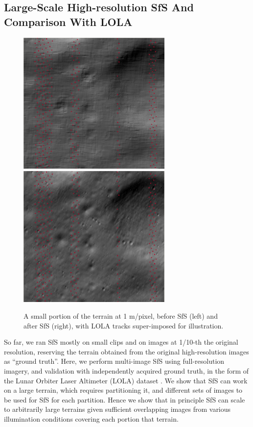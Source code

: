 \documentclass[12pt,oneside]{article}
\begin{document}
\subsection{Large-Scale High-resolution SfS And Comparison With LOLA}
\label{lola}
\begin{figure}[h!]
\begin{center}
\includegraphics[width=3in]{figures/sfs_lola_before.jpg}
\includegraphics[width=3in]{figures/sfs_lola_after.jpg}
\caption[sfs]{A small portion of the terrain at 1 m/pixel, 
before SfS (left) and after SfS (right), with LOLA tracks super-imposed for illustration.}
\label{fig:sfslola}
\end{center}
\end{figure}
So far, we ran SfS mostly on small clips and on images at 1/10-th the original resolution,
reserving the terrain obtained from the original high-resolution images as
``ground truth''.  Here, we perform multi-image SfS using full-resolution imagery, and
validation with independently acquired ground truth, in the form of the
Lunar Orbiter Laser Altimeter (LOLA) dataset \cite{zuber2010lunar}. We
show that SfS can work on a large terrain, which requires
partitioning it, and different sets of images to be used for SfS for each
partition.  Hence we show that in principle SfS can scale to arbitrarily
large terrains given sufficient overlapping images from various
illumination conditions covering each portion that terrain.
\end{document}

